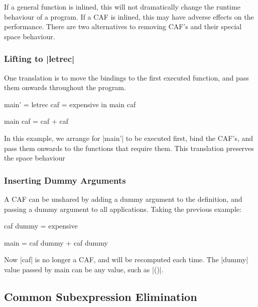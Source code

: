 If a general function is inlined, this will not dramatically change the runtime behaviour of a program. If a CAF is inlined, this may have adverse effects on the performance. There are two alternatives to removing CAF's and their special space behaviour.

\subsubsection{Lifting to |letrec|}

One translation is to move the bindings to the first executed function, and pass them onwards throughout the program.

\begin{code}
main' =  letrec caf = expensive
         in main caf

main caf = caf + caf
\end{code}

In this example, we arrange for |main'| to be executed first, bind the CAF's, and pass them onwards to the functions that require them. This translation preserves the space behaviour

\subsubsection{Inserting Dummy Arguments}

A CAF can be unshared by adding a dummy argument to the definition, and passing a dummy argument to all applications. Taking the previous example:

\begin{code}
caf dummy = expensive

main = caf dummy + caf dummy
\end{code}

Now |caf| is no longer a CAF, and will be recomputed each time. The |dummy| value passed by main can be any value, such as |()|.



\subsection{Common Subexpression Elimination}

\cite{chitil:cse}

